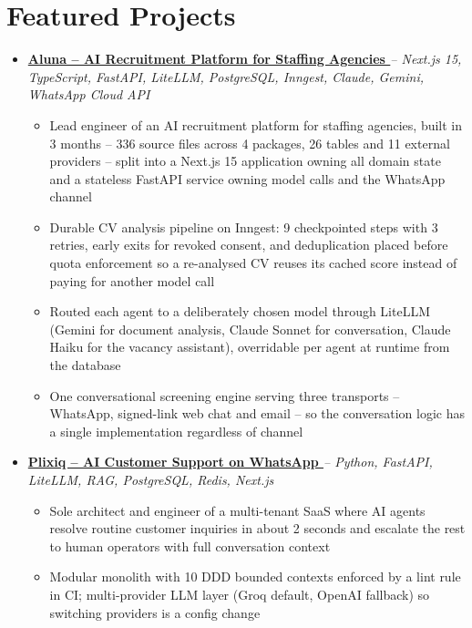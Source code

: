 \documentclass[letterpaper,10pt]{article}
\newcommand{\normalfaExternalLink}{{\mdseries\faExternalLink}}
\begin{document}
\section{Featured Projects}
\begin{itemize}[leftmargin=*, itemsep=2pt]
    \item \textbf{\href{https://www.aluna.works}{Aluna -- AI Recruitment Platform for Staffing Agencies \normalfaExternalLink}} \textit{-- Next.js 15, TypeScript, FastAPI, LiteLLM, PostgreSQL, Inngest, Claude, Gemini, WhatsApp Cloud API}
    \begin{itemize}[itemsep=0pt]
        \item Lead engineer of an AI recruitment platform for staffing agencies, built in 3 months -- 336 source files across 4 packages, 26 tables and 11 external providers -- split into a Next.js 15 application owning all domain state and a stateless FastAPI service owning model calls and the WhatsApp channel
        \item Durable CV analysis pipeline on Inngest: 9 checkpointed steps with 3 retries, early exits for revoked consent, and deduplication placed before quota enforcement so a re-analysed CV reuses its cached score instead of paying for another model call
        \item Routed each agent to a deliberately chosen model through LiteLLM (Gemini for document analysis, Claude Sonnet for conversation, Claude Haiku for the vacancy assistant), overridable per agent at runtime from the database
        \item One conversational screening engine serving three transports -- WhatsApp, signed-link web chat and email -- so the conversation logic has a single implementation regardless of channel
    \end{itemize}
    \item \textbf{\href{https://plixiq.com}{Plixiq -- AI Customer Support on WhatsApp \normalfaExternalLink}} \textit{-- Python, FastAPI, LiteLLM, RAG, PostgreSQL, Redis, Next.js}
    \begin{itemize}[itemsep=0pt]
        \item Sole architect and engineer of a multi-tenant SaaS where AI agents resolve routine customer inquiries in about 2 seconds and escalate the rest to human operators with full conversation context
        \item Modular monolith with 10 DDD bounded contexts enforced by a lint rule in CI; multi-provider LLM layer (Groq default, OpenAI fallback) so switching providers is a config change

\end{itemize}
\end{itemize}
\end{document}
